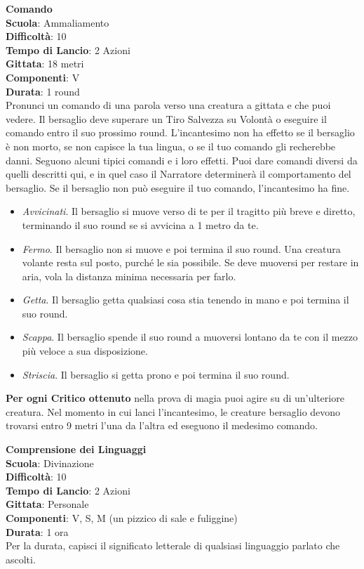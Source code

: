 \begin{multicols}{2}
\medskip\textbf{Comando}\\
\textbf{Scuola}: Ammaliamento\\
\textbf{Difficoltà}: 10\\
\textbf{Tempo di Lancio}: 2 Azioni\\
\textbf{Gittata}: 18 metri\\
\textbf{Componenti}: V\\
\textbf{Durata}: 1 round\\
Pronunci un comando di una parola verso una creatura a gittata e che puoi vedere. Il bersaglio deve superare un Tiro Salvezza su Volontà o eseguire il comando entro il suo prossimo round. L'incantesimo non ha effetto se il bersaglio è non morto, se non capisce la tua lingua, o se il tuo comando gli recherebbe danni. Seguono alcuni tipici comandi e i loro effetti. Puoi dare comandi diversi da quelli descritti qui, e in quel caso il Narratore determinerà il comportamento del bersaglio. Se il bersaglio non può eseguire il tuo comando, l'incantesimo ha fine.
\begin{itemize}
	\item 
\textit{Avvicinati}. Il bersaglio si muove verso di te per il tragitto più breve e diretto, terminando il suo round se si avvicina a 1 metro da te.
	\item 
\textit{Fermo}. Il bersaglio non si muove e poi termina il suo round. Una creatura volante resta sul posto, purché le sia possibile. Se deve muoversi per restare in aria, vola la distanza minima necessaria per farlo.
	\item 
	\textit{Getta}. Il bersaglio getta qualsiasi cosa stia tenendo in mano e poi termina il suo round. 	
	\item 
	\textit{Scappa}. Il bersaglio spende il suo round a muoversi lontano da te con il mezzo più veloce a sua disposizione.
	\item \textit{Striscia}. Il bersaglio si getta prono e poi termina il suo round.
\end{itemize}

\textbf{Per ogni Critico ottenuto} nella prova di magia puoi agire su di un'ulteriore creatura. Nel momento in cui lanci l'incantesimo, le creature bersaglio devono trovarsi entro 9 metri l'una da l'altra ed eseguono il medesimo comando.

\medskip\textbf{Comprensione dei Linguaggi}\\
\textbf{Scuola}: Divinazione\\
\textbf{Difficoltà}: 10\\
\textbf{Tempo di Lancio}: 2 Azioni\\
\textbf{Gittata}: Personale\\
\textbf{Componenti}: V, S, M (un pizzico di sale e fuliggine)\\
\textbf{Durata}: 1 ora\\
Per la durata, capisci il significato letterale di qualsiasi linguaggio parlato che ascolti.


\end{multicols}
